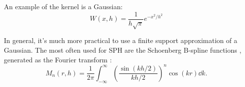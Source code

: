 An example of the kernel is a Gaussian:
\begin{equation}
  W(x, h) = \frac{1}{h\sqrt{\pi}} e^{-x^2/h^2}
\end{equation}







In general, it's much more practical to use a finite support approximation of a Gaussian.
The most often used for SPH are the Schoenberg  B-spline functions \citep{Schoenberg1946}, generated as the Fourier transform \citep{Monaghan1985, Monaghan2005, Price2012}:
\begin{equation}
M_n(r, h) = \frac{1}{2\pi}\int_{-\infty}^{\infty}{\left(\frac{\sin(kh/2)}{kh/2}\right)^n\cos(kr)\dd{k}}.
\end{equation}

